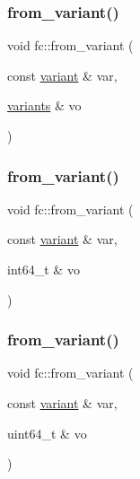 \mbox{\label{namespacefc_aadf423ceb30883b0c6ce5ae259f78022}} 
\subsubsection{\texorpdfstring{from\+\_\+variant()}{from\_variant()}\hspace{0.1cm}{\footnotesize\ttfamily [10/17]}}
{\footnotesize\ttfamily void fc\+::from\+\_\+variant (\begin{DoxyParamCaption}\item[{const \mbox{\hyperlink{classfc_1_1variant}{variant}} \&}]{var,  }\item[{\mbox{\hyperlink{classstd_1_1vector}{variants}} \&}]{vo }\end{DoxyParamCaption})}

\mbox{\label{namespacefc_ae9e9f124635561eb45adb84cc30a9f6d}} 
\subsubsection{\texorpdfstring{from\+\_\+variant()}{from\_variant()}\hspace{0.1cm}{\footnotesize\ttfamily [11/17]}}
{\footnotesize\ttfamily void fc\+::from\+\_\+variant (\begin{DoxyParamCaption}\item[{const \mbox{\hyperlink{classfc_1_1variant}{variant}} \&}]{var,  }\item[{int64\+\_\+t \&}]{vo }\end{DoxyParamCaption})}

\mbox{\label{namespacefc_afe67f9793ff8256f0e4b332c4ee1b419}} 
\subsubsection{\texorpdfstring{from\+\_\+variant()}{from\_variant()}\hspace{0.1cm}{\footnotesize\ttfamily [12/17]}}
{\footnotesize\ttfamily void fc\+::from\+\_\+variant (\begin{DoxyParamCaption}\item[{const \mbox{\hyperlink{classfc_1_1variant}{variant}} \&}]{var,  }\item[{uint64\+\_\+t \&}]{vo }\end{DoxyParamCaption})}

